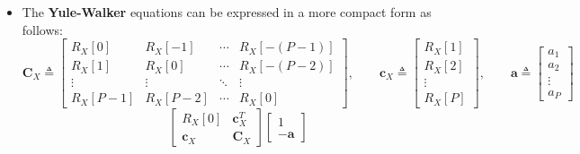 \begin{itemize}
\[
\begin{bmatrix}
R_X[0]   & R_X[-1] & R_X[-2] & \cdots & R_X[-P] \\
R_X[1]   & R_X[0]  & R_X[-1] & \cdots & R_X[-(P-1)] \\
R_X[2]   & R_X[1]  & R_X[0]  & \cdots & R_X[-(P-2)] \\
\vdots   & \vdots  & \vdots  & \ddots & \vdots     \\
R_X[P]   & R_X[P-1]& R_X[P-2]& \cdots & R_X[0]
\end{bmatrix}
\begin{bmatrix}
1 \\ -a_1 \\ -a_2 \\ \vdots \\ -a_P
\end{bmatrix}
=
\begin{bmatrix}
\sigma_w^2 \\ 0 \\ 0 \\ \vdots \\ 0
\end{bmatrix}
\]
\item The \textbf{Yule-Walker} equations can be expressed in a more compact form as follows:
\[
\mathbf{C}_X \triangleq
\begin{bmatrix}
R_X[0]   & R_X[-1]   & \cdots & R_X[-(P-1)] \\
R_X[1]   & R_X[0]    & \cdots & R_X[-(P-2)] \\
\vdots   & \vdots    & \ddots & \vdots      \\
R_X[P-1] & R_X[P-2]  & \cdots & R_X[0]
\end{bmatrix},
\qquad
\mathbf{c}_X \triangleq
\begin{bmatrix}
R_X[1] \\ R_X[2] \\ \vdots \\ R_X[P]
\end{bmatrix},
\qquad
\mathbf{a} \triangleq
\begin{bmatrix}
a_1 \\ a_2 \\ \vdots \\ a_P
\end{bmatrix}
\]
\[
\begin{bmatrix}
R_X[0] & \mathbf{c}_X^{T} \\
\mathbf{c}_X & \mathbf{C}_X
\end{bmatrix}
\begin{bmatrix}
1 \\ -\mathbf{a}

\end{bmatrix}\]
\end{itemize}
